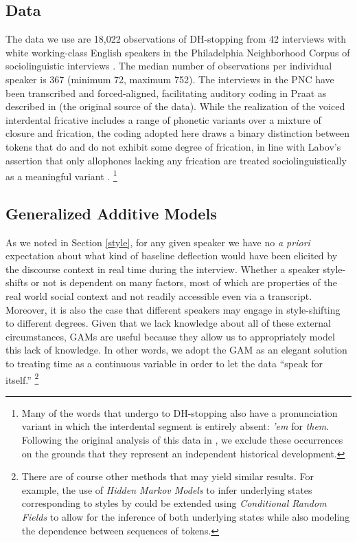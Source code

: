 \documentclass[12pt]{article}
\begin{document}
\subsection{Data}

The data we use are 18,022 observations of DH-stopping from 42 interviews with white working-class English speakers in the Philadelphia Neighborhood Corpus of sociolinguistic interviews \citep{Labov:2011a}.  The median number of observations per individual speaker is 367 (minimum 72, maximum 752). The interviews in the PNC have been transcribed and forced-aligned, facilitating auditory coding in Praat as described in \citet{Tamminga:2014b} (the original source of the data). While the realization of the voiced interdental fricative includes a range of phonetic variants over a mixture of closure and frication, the coding adopted here draws a binary distinction between tokens that do and do not exhibit some degree of frication, in line with Labov's assertion that only allophones lacking any frication are treated sociolinguistically as a meaningful variant \citep{Labov:2001a}.
\footnote{Many of the words that undergo to DH-stopping also have a pronunciation variant in which the interdental segment is entirely absent: \emph{'em} for \emph{them}. Following the original analysis of this data in \citet{Tamminga:2014b}, we exclude these occurrences on the grounds that they represent an independent historical development.} 

\subsection{Generalized Additive Models}

As we noted in Section \ref{style}, for any given speaker we have no \emph{a priori} expectation about what kind of baseline deflection would have been elicited by the discourse context in real time during the interview.  Whether a speaker style-shifts or not is dependent on many factors, most of which are properties of the real world social context and not readily accessible even via a transcript. Moreover, it is also the case that different speakers may engage in style-shifting to different degrees. Given that we lack knowledge about all of these external circumstances, GAMs are useful because they allow us to appropriately model this lack of knowledge. In other words, we adopt the GAM  as an elegant solution to treating time as a continuous variable in order to let the data ``speak for itself.'' \footnote{There are of course other methods that may yield similar results. For example, the use of \emph{Hidden Markov Models} to infer underlying states corresponding to styles by \citet{Ahern:2015} could be extended using \emph{Conditional Random Fields} to allow for the inference of both underlying states while also modeling the dependence between sequences of tokens.}
\end{document}
